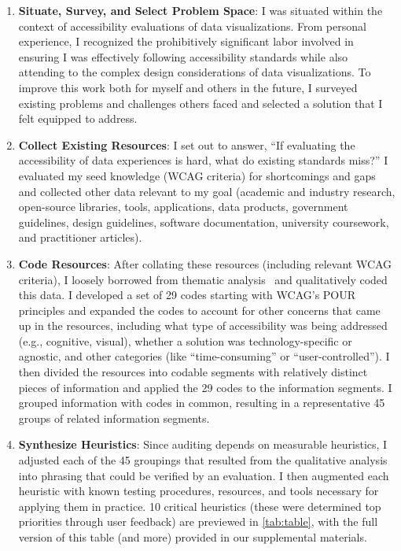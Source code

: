 \documentclass{egpubl}
\begin{document}
\begin{enumerate}
    \item \textbf{Situate, Survey, and Select Problem Space}: I was situated within the context of accessibility evaluations of data visualizations. From personal experience, I recognized the prohibitively significant labor involved in ensuring I was effectively following accessibility standards while also attending to the complex design considerations of data visualizations. To improve this work both for myself and others in the future, I surveyed existing problems and challenges others faced and selected a solution that I felt equipped to address.
    \item \textbf{Collect Existing Resources}: I set out to answer, ``If evaluating the accessibility of data experiences is hard, what do existing standards miss?'' I evaluated my seed knowledge (WCAG criteria) for shortcomings and gaps and collected other data relevant to my goal (academic and industry research, open-source libraries, tools, applications, data products, government guidelines, design guidelines, software documentation, university coursework, and practitioner articles).  
    \item \textbf{Code Resources}: After collating these resources (including relevant WCAG criteria), I loosely borrowed from thematic analysis~\cite{braun_clarke_thematic_2006} and qualitatively coded this data. I developed a set of 29 codes starting with WCAG's POUR principles and expanded the codes to account for other concerns that came up in the resources, including what type of accessibility was being addressed (e.g., cognitive, visual), whether a solution was technology-specific or agnostic, and other categories (like ``time-consuming'' or ``user-controlled''). I then divided the resources into codable segments with relatively distinct pieces of information and applied the 29 codes to the information segments. I grouped information with codes in common, resulting in a representative 45 groups of related information segments. 
    \item \textbf{Synthesize Heuristics}: Since auditing depends on measurable heuristics, I adjusted each of the 45 groupings that resulted from the qualitative analysis into phrasing that could be verified by an evaluation. I then augmented each heuristic with known testing procedures, resources, and tools necessary for applying them in practice. 10 critical heuristics (these were determined top priorities through user feedback) are previewed in \autoref{tab:table}, with the full version of this table (and more) provided in our supplemental materials.

\end{enumerate}
\end{document}
